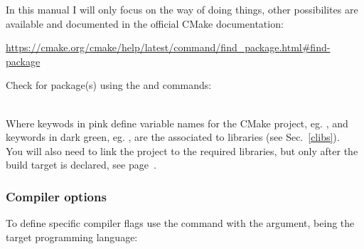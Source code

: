 In this manual I will only focus on the  way of doing things, other possibilites are available and documented in the official CMake documentation: 
\begin{center}\href{https://cmake.org/cmake/help/latest/command/find\_package.html\#find-package}{https://cmake.org/cmake/help/latest/command/find\_package.html\#find-package}\end{center}
Check for package(s) using the  and  commands: 
\begin{script}




\end{script}
\\[-0.25cm]
\noindent Where keywods in pink define variable names for the CMake project, eg. \texttt{}, 
and keywords in dark green, eg. , are the associated to  libraries (see Sec.~\ref{clibs}). \\ 
You will also need to link the project to the required libraries, but only after the build target is declared, see page~\pageref{clink}.

\subsubsection*{Compiler options}

To define specific compiler flags use the  command with the 
argument,  being the target programming language:
\begin{script}
\end{script}


